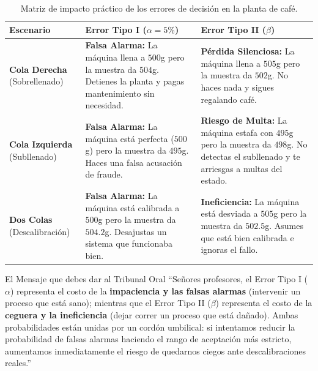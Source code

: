 \documentclass{article}
\begin{document}
\begin{table}[h!]
\centering
\small
\renewcommand{\arraystretch}{1.5}
\begin{tabular}{p{2.8cm} p{4.6cm} p{4.6cm}}
\toprule
\textbf{Escenario} & \textbf{Error Tipo I ($\alpha = 5\%$)} & \textbf{Error Tipo II ($\beta$)} \\
\midrule
\textbf{Cola Derecha} \newline (Sobrellenado) & 
\textbf{Falsa Alarma:} \newline 
La máquina llena a $500$g pero la muestra da $504$g. Detienes la planta y pagas mantenimiento sin necesidad. & 
\textbf{Pérdida Silenciosa:} \newline 
La máquina llena a $505$g pero la muestra da $502$g. No haces nada y sigues regalando café. \\
\midrule
\textbf{Cola Izquierda} \newline (Subllenado) & 
\textbf{Falsa Alarma:} \newline 
La máquina está perfecta ($500$g) pero la muestra da $495$g. Haces una falsa acusación de fraude. & 
\textbf{Riesgo de Multa:} \newline 
La máquina estafa con $495$g pero la muestra da $498$g. No detectas el subllenado y te arriesgas a multas del estado. \\
\midrule
\textbf{Dos Colas} \newline (Descalibración) & 
\textbf{Falsa Alarma:} \newline 
La máquina está calibrada a $500$g pero la muestra da $504.2$g. Desajustas un sistema que funcionaba bien. & 
\textbf{Ineficiencia:} \newline 
La máquina está desviada a $505$g pero la muestra da $502.5$g. Asumes que está bien calibrada e ignoras el fallo. \\
\bottomrule
\end{tabular}
\caption{Matriz de impacto práctico de los errores de decisión en la planta de café.}
\end{table}

\begin{didactico}{El Mensaje que debes dar al Tribunal Oral}
``Señores profesores, el Error Tipo I ($\alpha$) representa el costo de la \textbf{impaciencia y las falsas alarmas} (intervenir un proceso que está sano); mientras que el Error Tipo II ($\beta$) representa el costo de la \textbf{ceguera y la ineficiencia} (dejar correr un proceso que está dañado). Ambas probabilidades están unidas por un cordón umbilical: si intentamos reducir la probabilidad de falsas alarmas haciendo el rango de aceptación más estricto, aumentamos inmediatamente el riesgo de quedarnos ciegos ante descalibraciones reales.''
\end{didactico}
\end{document}
